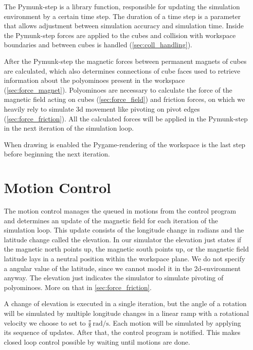 The Pymunk-step is a library function, responsible for updating the simulation environment by a certain time step.
The duration of a time step is a parameter that allows adjustment between simulation accuracy and simulation time. 
Inside the Pymunk-step forces are applied to the cubes and collision with workspace boundaries and between cubes is handled (\autoref{sec:coll_handling}).

After the Pymunk-step the magnetic forces between permanent magnets of cubes are calculated, which also determines connections of cube faces used to retrieve information about the polyominoes present in the workspace (\autoref{sec:force_magnet}).
Polyominoes are necessary to calculate the force of the magnetic field acting on cubes (\autoref{sec:force_field}) and friction forces, on which we heavily rely to simulate 3d movement like pivoting on pivot edges (\autoref{sec:force_friction}).
All the calculated forces will be applied in the Pymunk-step in the next iteration of the simulation loop.

When drawing is enabled the Pygame-rendering of the workspace is the last step before beginning the next iteration.


\section{Motion Control}
\label{sec:motion_control}

The motion control manages the queued in motions from the control program and determines an update of the magnetic field for each iteration of the simulation loop.
This update consists of the longitude change in radians and the latitude change called the elevation.
In our simulator the elevation just states if the magnetic north points up, the magnetic south points up, or the magnetic field latitude lays in a neutral position within the workspace plane.
We do not specify a angular value of the latitude, since we cannot model it in the 2d-environment anyway.
The elevation just indicates the simulator to simulate pivoting of polyominoes.
More on that in \autoref{sec:force_friction}.

A change of elevation is executed in a single iteration, but the angle of a rotation will be simulated by multiple longitude changes in a linear ramp with a rotational velocity we choose to set to $\frac{\pi}{8} \, \text{rad}/\text{s}$.
Each motion will be simulated by applying its sequence of updates.
After that, the control program is notified.
This makes closed loop control possible by waiting until motions are done.

